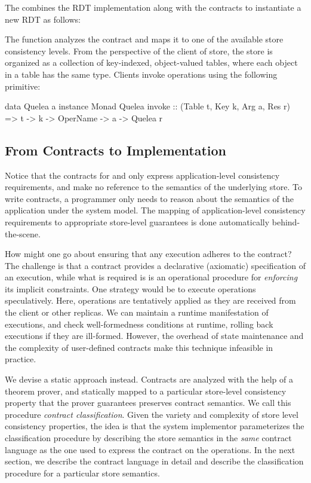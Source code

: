 The combines the RDT implementation along with the contracts to instantiate a
new RDT as follows:


\noindent The function  analyzes the contract and maps it to one of the
available store consistency levels. From the perspective of the client of \name
store, the store is organized as a collection of key-indexed, object-valued
tables, where each object in a table has the same type. Clients invoke
operations using the following primitive:

\begin{codehaskell}
data Quelea a
instance Monad Quelea
invoke :: (Table t, Key k, Arg a, Res r)
			 => t -> k -> OperName -> a -> Quelea r
\end{codehaskell}

\subsection{From Contracts to Implementation}

Notice that the contracts for  and  only express
application-level consistency requirements, and make no reference to the
semantics of the underlying store. To write contracts, a programmer only needs
to reason about the semantics of the application under the \name system model.
The mapping of application-level consistency requirements to appropriate
store-level guarantees is done automatically behind-the-scene.

How might one go about ensuring that any execution adheres to the contract? The
challenge is that a contract provides a declarative (axiomatic) specification
of an execution, while what is required is is an operational procedure for
\emph{enforcing} its implicit constraints. One strategy would be to execute
operations speculatively.  Here, operations are tentatively applied as they are
received from the client or other replicas. We can maintain a runtime
manifestation of executions, and check well-formedness conditions at runtime,
rolling back executions if they are ill-formed. However, the overhead of state
maintenance and the complexity of user-defined contracts make this technique
infeasible in practice.

We devise a static approach instead. Contracts are analyzed with the help of a
theorem prover, and statically mapped to a particular store-level consistency
property that the prover guarantees preserves contract semantics. We call this
procedure \emph{contract classification}. Given the variety and complexity of
store level consistency properties, the idea is that the system implementor
parameterizes the classification procedure by describing the store semantics in
the \emph{same} contract language as the one used to express the contract on
the operations. In the next section, we describe the contract language in
detail and describe the classification procedure for a particular store
semantics.
